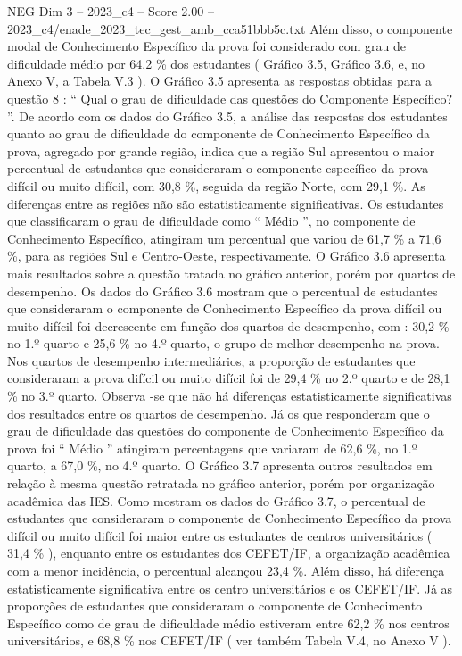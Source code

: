 \begin{textsample}{NEG Dim 3 – 2023\_c4 – Score 2.00 – 2023\_c4/enade\_2023\_tec\_gest\_amb\_cca51bbb5c.txt}
Além disso, o componente modal de Conhecimento Específico da prova foi considerado com grau de dificuldade médio por 64,2 \% dos estudantes ( Gráfico 3.5, Gráfico 3.6, e, no Anexo V, a Tabela V.3 ).
O Gráfico 3.5 apresenta as respostas obtidas para a questão 8 : “ Qual o grau de dificuldade das questões do Componente Específico? ”.
De acordo com os dados do Gráfico 3.5, a análise das respostas dos estudantes quanto ao grau de dificuldade do componente de Conhecimento Específico da prova, agregado por grande região, indica que a região Sul apresentou o maior percentual de estudantes que consideraram o componente específico da prova difícil ou muito difícil, com 30,8 \%, seguida da região Norte, com 29,1 \%.
As diferenças entre as regiões não são estatisticamente significativas.
Os estudantes que classificaram o grau de dificuldade como “ Médio ”, no componente de Conhecimento Específico, atingiram um percentual que variou de 61,7 \% a 71,6 \%, para as regiões Sul e Centro-Oeste, respectivamente.
O Gráfico 3.6 apresenta mais resultados sobre a questão tratada no gráfico anterior, porém por quartos de desempenho.
Os dados do Gráfico 3.6 mostram que o percentual de estudantes que consideraram o componente de Conhecimento Específico da prova difícil ou muito difícil foi decrescente em função dos quartos de desempenho, com : 30,2 \% no 1.º quarto e 25,6 \% no 4.º quarto, o grupo de melhor desempenho na prova.
Nos quartos de desempenho intermediários, a proporção de estudantes que consideraram a prova difícil ou muito difícil foi de 29,4 \% no 2.º quarto e de 28,1 \% no 3.º quarto.
Observa -se que não há diferenças estatisticamente significativas dos resultados entre os quartos de desempenho.
Já os que responderam que o grau de dificuldade das questões do componente de Conhecimento Específico da prova foi “ Médio ” atingiram percentagens que variaram de 62,6 \%, no 1.º quarto, a 67,0 \%, no 4.º quarto.
O Gráfico 3.7 apresenta outros resultados em relação à mesma questão retratada no gráfico anterior, porém por organização acadêmica das IES.
Como mostram os dados do Gráfico 3.7, o percentual de estudantes que consideraram o componente de Conhecimento Específico da prova difícil ou muito difícil foi maior entre os estudantes de centros universitários ( 31,4 \% ), enquanto entre os estudantes dos CEFET/IF, a organização acadêmica com a menor incidência, o percentual alcançou 23,4 \%.
Além disso, há diferença estatisticamente significativa entre os centro universitários e os CEFET/IF.
Já as proporções de estudantes que consideraram o componente de Conhecimento Específico como de grau de dificuldade médio estiveram entre 62,2 \% nos centros universitários, e 68,8 \% nos CEFET/IF ( ver também Tabela V.4, no Anexo V ).

\end{textsample}
